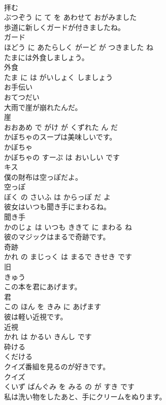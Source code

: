 \documentclass[8pt]{extreport}
\begin{document}
\begin{CJK}{UTF8}{min}
\\	拝む 
\\	ぶつぞう に て を あわせて おがみました			
\\	歩道に新しくガードが付きましたね。	
\\	ガード 
\\	ほどう に あたらしく がーど が つきました ね			
\\	たまには外食しましょう。	
\\	外食 
\\	たま に は がいしょく しましょう			
\\	お手伝い	
\\	おてつだい		
\\	大雨で崖が崩れたんだ。	
\\	崖 
\\	おおあめ で がけ が くずれた ん だ			
\\	かぼちゃのスープは美味しいです。	
\\	かぼちゃ 
\\	かぼちゃの すーぷ は おいしい です			
\\	キス	
\\	僕の財布は空っぽだよ。	
\\	空っぽ 
\\	ぼく の さいふ は からっぽ だ よ			
\\	彼女はいつも聞き手にまわるね。	
\\	聞き手 
\\	かのじょ は いつも ききて に まわる ね			
\\	彼のマジックはまるで奇跡です。	
\\	奇跡 
\\	かれ の まじっく は まるで きせき です			
\\	旧	
\\	きゅう		
\\	この本を君にあげます。	
\\	君 
\\	この ほん を きみ に あげます			
\\	彼は軽い近視です。	
\\	近視 
\\	かれ は かるい きんし です			
\\	砕ける	
\\	くだける		
\\	クイズ番組を見るのが好きです。	
\\	クイズ 
\\	くいず ばんぐみ を みる の が すき です			
\\	私は洗い物をしたあと、手にクリームをぬります。	

\end{CJK}
\end{document}
